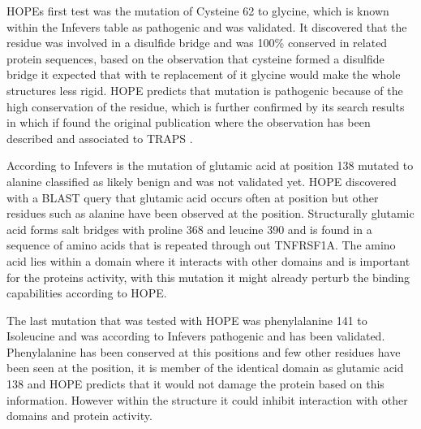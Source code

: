 	HOPEs first test was the mutation of Cysteine 62 to glycine, which is known within the Infevers table as pathogenic and was validated. It discovered that the residue was involved in a disulfide bridge and was 100\% conserved in related protein sequences, based on the observation that cysteine formed a disulfide bridge it expected that with te replacement of it glycine would make the whole structures less rigid. HOPE predicts that mutation is pathogenic because of the high conservation of the residue, which is further confirmed by its search results in which if found the original publication where the observation has been described and associated to TRAPS \cite{}.
	
	According to Infevers is the mutation of glutamic acid at position 138 mutated to alanine classified as likely benign and was not validated yet. HOPE discovered with a BLAST query that glutamic acid occurs often at position but other residues such as alanine have been observed at the position. Structurally glutamic acid forms salt bridges with proline  368 and leucine 390 and is found in a sequence of amino acids that is repeated through out TNFRSF1A. The amino acid lies within a domain where it interacts with other domains and is important for the proteins activity, with this mutation it might already perturb the binding capabilities according to HOPE.
	
	The last mutation that was tested with HOPE was phenylalanine 141 to Isoleucine and was according to Infevers pathogenic and has been validated. Phenylalanine has been conserved at this positions and few other residues have been seen at the position, it is member of the identical domain as glutamic acid 138 and HOPE predicts that it would not damage the protein based on this information. However within the structure it could inhibit interaction with other domains and protein activity.
	
